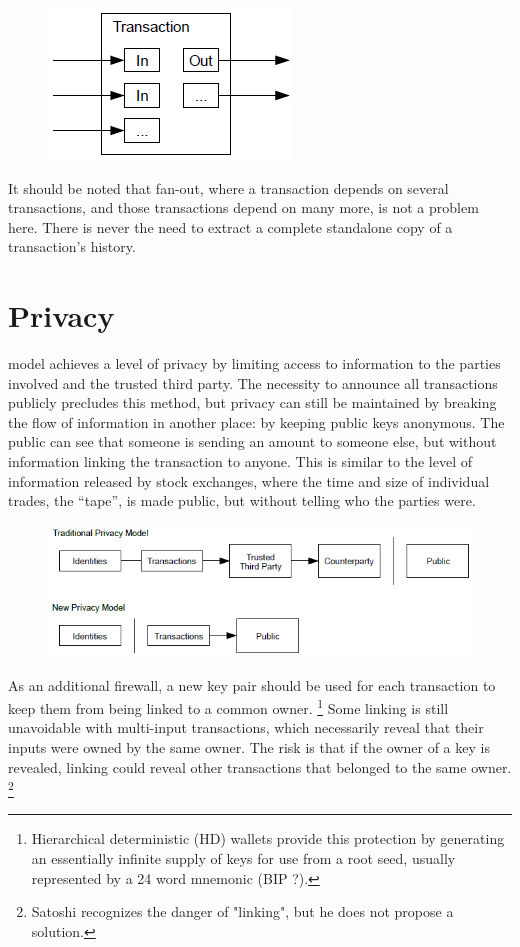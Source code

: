 \documentclass[nohyper]{tufte-handout}
\begin{document}
\begin{figure}[!h]
\centering
\includegraphics[width=0.3725\linewidth]{combining-splitting.png}

\end{figure}

It should be noted that fan-out, where a transaction depends on several
transactions, and those transactions depend on many more, is not a
problem here. There is never the need to extract a complete standalone
copy of a transaction's history.

\section{Privacy}\label{privacy}

 model achieves a level of privacy by limiting access to information to the parties involved and the trusted third party. The necessity to announce all transactions publicly precludes this method, but privacy can still be maintained by breaking the flow of information in another place: by keeping public keys anonymous. The public can see that someone is sending an amount to someone else, but without information linking the transaction to anyone. This is similar to the level of information released by stock exchanges, where the time and size of individual trades, the ``tape'', is made public, but without telling who the parties were.

\begin{figure}[!h]
\centering
\includegraphics[width=0.75\linewidth]{privacy.png}
\end{figure}

As an additional firewall, a new key pair should be used for each
transaction to keep them from being linked to a common owner.  \footnote{Hierarchical deterministic (HD) wallets provide this protection by generating an essentially infinite supply of keys for use from a root seed, usually represented by a 24 word mnemonic (BIP ?).} Some
linking is still unavoidable with multi-input transactions, which
necessarily reveal that their inputs were owned by the same owner. The
risk is that if the owner of a key is revealed, linking could reveal
other transactions that belonged to the same owner.  \footnote{Satoshi recognizes the danger of "linking", but he does not propose a solution.}
\end{document}
